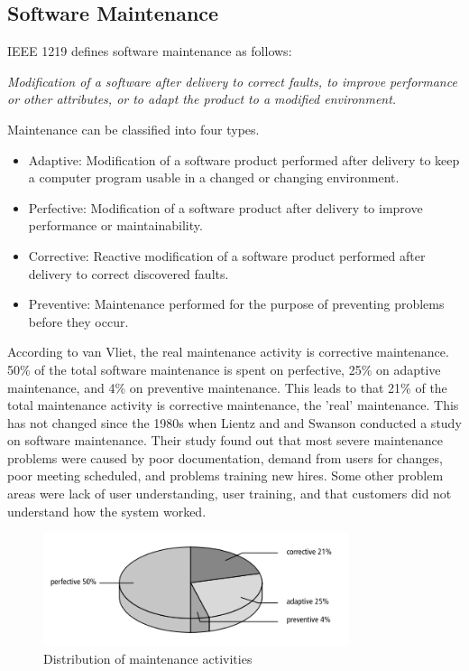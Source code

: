 {\subsection{Software Maintenance}
IEEE 1219 defines software maintenance as follows\cite{720567}:
\begin{displayquote}
\textit{Modification of a software after delivery to correct faults, to improve performance or other attributes, or to adapt the product to a modified environment.}
\end{displayquote} 
Maintenance can be classified into four types\cite{Bennett:2000:SME:336512.336534,720567}.

\begin{itemize}
	\item Adaptive: Modification of a software product performed after delivery to keep a computer program usable in a changed or changing environment.
	\item Perfective: Modification of a software product after delivery to improve performance or maintainability.
	\item Corrective: Reactive modification of a software product performed after delivery to correct discovered faults.
	\item Preventive: Maintenance performed for the purpose of preventing problems before they occur.
\end{itemize}

According to van Vliet, the real maintenance activity is corrective maintenance\cite{Vliet:2008:SEP:1481475}. 50\% of the total software maintenance is spent on perfective, 25\% on adaptive maintenance, and 4\% on preventive maintenance. This leads to that 21\% of the total maintenance activity is corrective maintenance, the 'real' maintenance\cite{Vliet:2008:SEP:1481475}. This has not changed since the 1980s when Lientz and and Swanson conducted a study on software maintenance\cite{lientz1980software}. Their study found out that most severe maintenance problems were caused by poor documentation, demand from users for changes, poor meeting scheduled, and problems training new hires. Some other problem areas were lack of user understanding, user training, and that customers did not understand how the system worked.

\begin{figure}
	\centering
	\includegraphics[width=0.8\textwidth]{images/maintenance.png}
	\caption{Distribution of maintenance activities\cite{Vliet:2008:SEP:1481475}}
	\label{fig:maintenanceActivities}
\end{figure}



}
